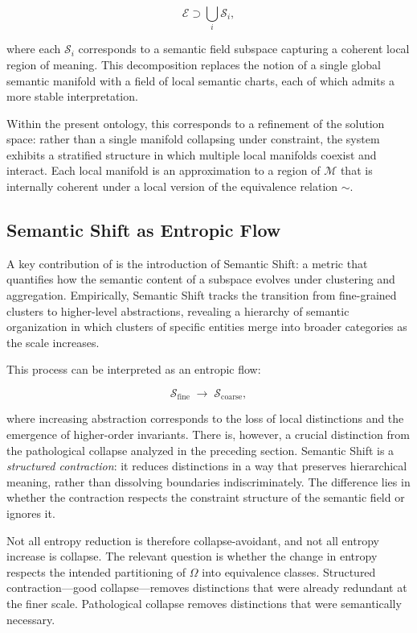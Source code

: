 \documentclass[11pt, twoside]{article}
\theoremstyle{plain}
\theoremstyle{definition}
\theoremstyle{remark}
\begin{document}
\[
\mathcal{E} \supset \bigcup_i \mathcal{S}_i,
\]

where each $\mathcal{S}_i$ corresponds to a semantic field subspace capturing a coherent local region of meaning. This decomposition replaces the notion of a single global semantic manifold with a field of local semantic charts, each of which admits a more stable interpretation.

Within the present ontology, this corresponds to a refinement of the solution space: rather than a single manifold collapsing under constraint, the system exhibits a stratified structure in which multiple local manifolds coexist and interact. Each local manifold is an approximation to a region of $\mathcal{M}$ that is internally coherent under a local version of the equivalence relation $\sim$.

\subsection{Semantic Shift as Entropic Flow}

A key contribution of \cite{sun2025swallow} is the introduction of Semantic Shift: a metric that quantifies how the semantic content of a subspace evolves under clustering and aggregation. Empirically, Semantic Shift tracks the transition from fine-grained clusters to higher-level abstractions, revealing a hierarchy of semantic organization in which clusters of specific entities merge into broader categories as the scale increases.

This process can be interpreted as an entropic flow:

\[
\mathcal{S}_{\text{fine}} \;\longrightarrow\; \mathcal{S}_{\text{coarse}},
\]

where increasing abstraction corresponds to the loss of local distinctions and the emergence of higher-order invariants. There is, however, a crucial distinction from the pathological collapse analyzed in the preceding section. Semantic Shift is a \emph{structured contraction}: it reduces distinctions in a way that preserves hierarchical meaning, rather than dissolving boundaries indiscriminately. The difference lies in whether the contraction respects the constraint structure of the semantic field or ignores it.

Not all entropy reduction is therefore collapse-avoidant, and not all entropy increase is collapse. The relevant question is whether the change in entropy respects the intended partitioning of $\Omega$ into equivalence classes. Structured contraction---good collapse---removes distinctions that were already redundant at the finer scale. Pathological collapse removes distinctions that were semantically necessary.
\end{document}
